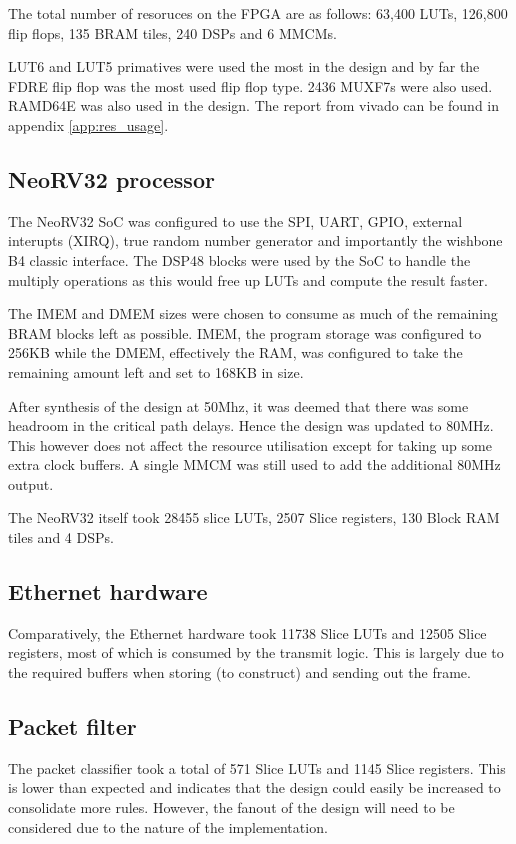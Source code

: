 The total number of resoruces on the FPGA are as follows: 63,400 LUTs, 126,800 flip flops, 135 BRAM tiles, 240 DSPs and 6 MMCMs.

LUT6 and LUT5 primatives were used the most in the design and by far the FDRE flip flop was the most used flip flop type. 2436 MUXF7s were also used. RAMD64E was also used in the design. The report from vivado can be found in appendix \ref{app:res_usage}.

\subsection{NeoRV32 processor}

The NeoRV32 SoC was configured to use the SPI, UART, GPIO, external interupts (XIRQ), true random number generator and importantly the wishbone B4 classic interface. The DSP48 blocks were used by the SoC to handle the multiply operations as this would free up LUTs and compute the result faster. 

The IMEM and DMEM sizes were chosen to consume as much of the remaining BRAM blocks left as possible. IMEM, the program storage was configured to 256KB while the DMEM, effectively the RAM, was configured to take the remaining amount left and set to 168KB in size. 

After synthesis of the design at 50Mhz, it was deemed that there was some headroom in the critical path delays. Hence the design was updated to 80MHz. This however does not affect the resource utilisation except for taking up some extra clock buffers. A single MMCM was still used to add the additional 80MHz output. 

The NeoRV32 itself took 28455 slice LUTs, 2507 Slice registers, 130 Block RAM tiles and 4 DSPs. 


\subsection{Ethernet hardware}
Comparatively, the Ethernet hardware took 11738 Slice LUTs and 12505 Slice registers, most of which is consumed by the transmit logic. This is largely due to the required buffers when storing (to construct) and sending out the frame. 

\subsection{Packet filter}
The packet classifier took a total of 571 Slice LUTs and 1145 Slice registers. This is lower than expected and indicates that the design could easily be increased to consolidate more rules. However, the fanout of the design will need to be considered due to the nature of the implementation. 





